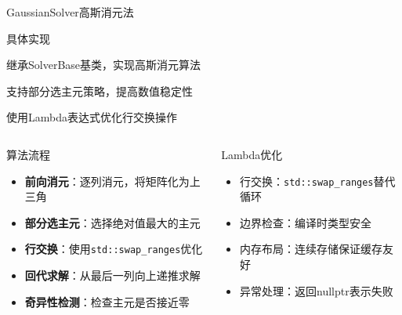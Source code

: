 \documentclass[UTF8,aspectratio=169]{beamer}
\begin{document}
\begin{frame}{GaussianSolver高斯消元法}
    \begin{ytublock}{具体实现}
        \item 继承SolverBase基类，实现高斯消元算法
        \item 支持部分选主元策略，提高数值稳定性
        \item 使用Lambda表达式优化行交换操作
    \end{ytublock}

    \begin{columns}
        \begin{block}{算法流程}
            \begin{itemize}
                \item \textbf{前向消元}：逐列消元，将矩阵化为上三角
                \item \textbf{部分选主元}：选择绝对值最大的主元
                \item \textbf{行交换}：使用\texttt{std::swap\_ranges}优化
                \item \textbf{回代求解}：从最后一列向上递推求解
                \item \textbf{奇异性检测}：检查主元是否接近零
            \end{itemize}
        \end{block}

        \begin{block}{Lambda优化}
            \begin{itemize}
                \item 行交换：\texttt{std::swap\_ranges}替代循环
                \item 边界检查：编译时类型安全
                \item 内存布局：连续存储保证缓存友好
                \item 异常处理：返回nullptr表示失败
            \end{itemize}
        \end{block}
    \end{columns}
\end{frame}
\end{document}
